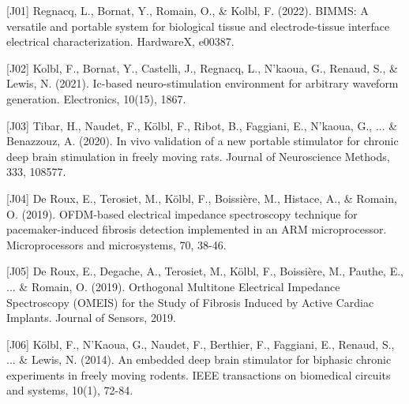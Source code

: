 


\begin{cvskills}
  \cvskill
    {[J01]} %
    {Regnacq, L., Bornat, Y., Romain, O., \& Kolbl, F. (2022). BIMMS: A versatile and portable system for biological tissue and electrode-tissue interface electrical characterization. HardwareX, e00387.} %
\end{cvskills}  
\begin{cvskills}
  \cvskill
    {[J02]} %
    {Kolbl, F., Bornat, Y., Castelli, J., Regnacq, L., N’kaoua, G., Renaud, S., \& Lewis, N. (2021). Ic-based neuro-stimulation environment for arbitrary waveform generation. Electronics, 10(15), 1867.} %
\end{cvskills}  
\begin{cvskills}
  \cvskill
    {[J03]}
    {Tibar, H., Naudet, F., Kölbl, F., Ribot, B., Faggiani, E., N’kaoua, G., ... \& Benazzouz, A. (2020). In vivo validation of a new portable stimulator for chronic deep brain stimulation in freely moving rats. Journal of Neuroscience Methods, 333, 108577.}
\end{cvskills}  
\begin{cvskills}  
  \cvskill
    {[J04]}
    {De Roux, E., Terosiet, M., Kölbl, F., Boissière, M., Histace, A., \& Romain, O. (2019). OFDM-based electrical impedance spectroscopy technique for pacemaker-induced fibrosis detection implemented in an ARM microprocessor. Microprocessors and microsystems, 70, 38-46.}
\end{cvskills}  
\begin{cvskills}  
  \cvskill
    {[J05]}
    {De Roux, E., Degache, A., Terosiet, M., Kölbl, F., Boissière, M., Pauthe, E., ... \& Romain, O. (2019). Orthogonal Multitone Electrical Impedance Spectroscopy (OMEIS) for the Study of Fibrosis Induced by Active Cardiac Implants. Journal of Sensors, 2019.}
\end{cvskills}  
\begin{cvskills}    
  \cvskill
    {[J06]}
    {Kölbl, F., N'Kaoua, G., Naudet, F., Berthier, F., Faggiani, E., Renaud, S., ... \& Lewis, N. (2014). An embedded deep brain stimulator for biphasic chronic experiments in freely moving rodents. IEEE transactions on biomedical circuits and systems, 10(1), 72-84.}
\end{cvskills}

